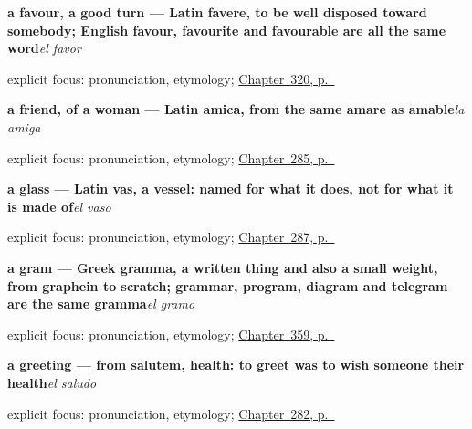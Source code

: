 \noindent\begin{minipage}[t]{\linewidth}
\raggedright
\textbf{a favour, a good turn — Latin favere, to be well disposed toward somebody; English favour, favourite and favourable are all the same word}\enspace\emph{el favor}\par
\footnotesize explicit focus: pronunciation, etymology; \hyperref[ch:favor-y-culpa]{Chapter~320, p.~\pageref*{ch:favor-y-culpa}}
\end{minipage}\par\smallskip

\noindent\begin{minipage}[t]{\linewidth}
\raggedright
\textbf{a friend, of a woman — Latin amica, from the same amare as amable}\enspace\emph{la amiga}\par
\footnotesize explicit focus: pronunciation, etymology; \hyperref[ch:quien-es]{Chapter~285, p.~\pageref*{ch:quien-es}}
\end{minipage}\par\smallskip

\noindent\begin{minipage}[t]{\linewidth}
\raggedright
\textbf{a glass — Latin vas, a vessel: named for what it does, not for what it is made of}\enspace\emph{el vaso}\par
\footnotesize explicit focus: pronunciation, etymology; \hyperref[ch:cinco-cosas]{Chapter~287, p.~\pageref*{ch:cinco-cosas}}
\end{minipage}\par\smallskip

\noindent\begin{minipage}[t]{\linewidth}
\raggedright
\textbf{a gram — Greek gramma, a written thing and also a small weight, from graphein to scratch; grammar, program, diagram and telegram are the same gramma}\enspace\emph{el gramo}\par
\footnotesize explicit focus: pronunciation, etymology; \hyperref[ch:el-kilo-y-el-litro]{Chapter~359, p.~\pageref*{ch:el-kilo-y-el-litro}}
\end{minipage}\par\smallskip

\noindent\begin{minipage}[t]{\linewidth}
\raggedright
\textbf{a greeting — from salutem, health: to greet was to wish someone their health}\enspace\emph{el saludo}\par
\footnotesize explicit focus: pronunciation, etymology; \hyperref[ch:encuentro]{Chapter~282, p.~\pageref*{ch:encuentro}}
\end{minipage}\par\smallskip

